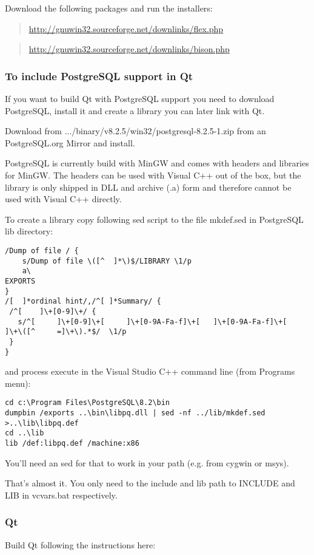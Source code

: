 Download the following packages and run the installers:

	\begin{quotation}
\url{http://gnuwin32.sourceforge.net/downlinks/flex.php}
	\end{quotation}

	\begin{quotation}
\url{http://gnuwin32.sourceforge.net/downlinks/bison.php}
	\end{quotation}

\subsubsection{To include  PostgreSQL support in Qt}
If you want to build Qt with PostgreSQL support you need to download
PostgreSQL, install it and create a library you can later link with Qt.

Download from .../binary/v8.2.5/win32/postgresql-8.2.5-1.zip from an
PostgreSQL.org Mirror and install.

PostgreSQL is currently build with MinGW and comes with headers and libraries
for MinGW.  The headers can be used with Visual C++ out of the box, but the library
is only shipped in DLL and archive (.a) form and therefore cannot be used with
Visual C++ directly.

To create a library copy following sed script to the file mkdef.sed in
PostgreSQL lib directory:

\begin{verbatim}
/Dump of file / {
	s/Dump of file \([^	 ]*\)$/LIBRARY \1/p
	a\
EXPORTS
}
/[ 	]*ordinal hint/,/^[	]*Summary/ {
 /^[ 	]\+[0-9]\+/ {
   s/^[ 	]\+[0-9]\+[ 	]\+[0-9A-Fa-f]\+[ 	]\+[0-9A-Fa-f]\+[ 	]\+\([^ 	=]\+\).*$/	\1/p
 }
}
\end{verbatim}

and process execute in the Visual Studio C++ command line (from Programs menu):

\begin{verbatim}
cd c:\Program Files\PostgreSQL\8.2\bin
dumpbin /exports ..\bin\libpq.dll | sed -nf ../lib/mkdef.sed >..\lib\libpq.def
cd ..\lib
lib /def:libpq.def /machine:x86
\end{verbatim}

You'll need an sed for that to work in your path (e.g. from cygwin or msys).

That's almost it.  You only need to the include and lib path to INCLUDE and LIB
in vcvars.bat respectively.

\subsubsection{Qt}
Build Qt following the instructions here:

